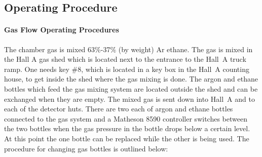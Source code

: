 \subsection{Operating Procedure}
\paragraph {Gas Flow Operating Procedures}

The chamber gas is mixed 63$\%$-37$\%$ (by weight) Ar ethane. The gas is mixed
in the Hall A gas shed which is located next to the entrance to the 
Hall~A truck ramp. One needs key \#8, which is located in a key box 
in the Hall~A counting house, to get inside the shed 
where the gas mixing is done. 
The argon and ethane
bottles which feed the gas mixing system are located outside the shed
and can be exchanged when they are empty. The mixed gas is sent down into
Hall~A and to each of the detector huts. There are two each of argon and
ethane bottles connected to the gas system and a   Matheson 8590 controller
switches between the two bottles when the gas pressure in the bottle
drops below  a certain level. At this point the one bottle can be replaced 
while the other is being used. The procedure for changing gas bottles
is outlined below: 
